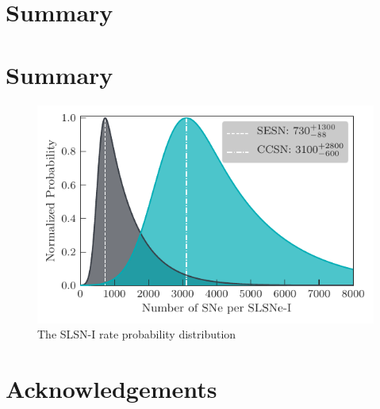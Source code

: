\documentclass[a4paper,fleqn,usenatbib]{mnras}
\begin{document}
\section{Summary}






\section{Summary}


\begin{figure}
	\includegraphics[width=\linewidth]{./bothRateCompare.pdf}
    \caption{The SLSN-I rate probability distribution}
    \label{fig:compare2SLSN}
\end{figure}

\section*{Acknowledgements}





% 


\end{document}
